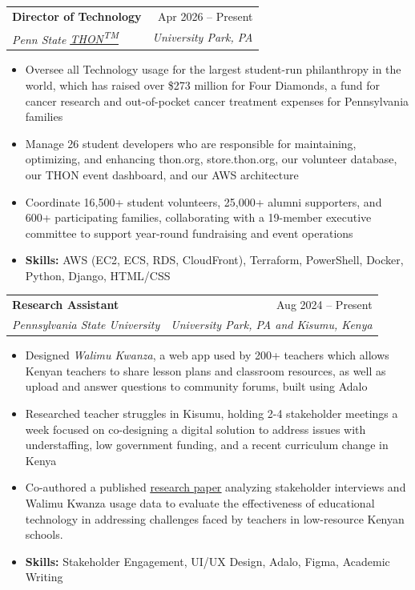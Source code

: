 \documentclass[letterpaper,11pt]{article}
\makeatletter
\newcommand{\resumeItem}[1]{
  \item\small{
    {#1\par\vspace{-2pt}}
  }
}
\newcommand{\resumeSubheading}[4]{
  \vspace{-2pt}\item
    \begin{tabular*}{0.97\textwidth}[t]{l@{\extracolsep{\fill}}r}
      \textbf{#1} & {#2} \\
      \textit{\small#3} & \textit{\small #4} \\
    \end{tabular*}\vspace{-7pt}
}
\newcommand{\resumeSubSubheading}[2]{
    \item
    \begin{tabular*}{0.97\textwidth}{l@{\extracolsep{\fill}}r}
      \textit{\small#1} & \textit{\small #2} \\
    \end{tabular*}\vspace{-7pt}
}
\newcommand{\resumeSubHeadingListEnd}{\end{itemize}}
\newcommand{\resumeItemListStart}{\begin{itemize}}
\newcommand{\resumeItemListEnd}{\end{itemize}\vspace{-5pt}}
\makeatother
\begin{document}
    \resumeSubheading
      {Director of Technology}{Apr 2026 -- Present}
      {Penn State \href{https://www.thon.org}{\underline{THON\textsuperscript{TM}}}}{University Park, PA}
      \resumeItemListStart
        \resumeItem{Oversee all Technology usage for the largest student-run philanthropy in the world, which has raised over \$273 
        million for Four Diamonds, a fund for cancer research and out-of-pocket cancer treatment expenses for Pennsylvania families}
        \resumeItem{Manage 26 student developers who are responsible for maintaining, optimizing, and enhancing thon.org, store.thon.org, our 
        volunteer database, our THON event dashboard, and our AWS architecture}
        \resumeItem{Coordinate 16,500+ student volunteers, 25,000+ alumni supporters, and 600+ participating families, collaborating with a
         19-member executive committee to support year-round fundraising and event operations}
        \resumeItem{\textbf{Skills:} AWS (EC2, ECS, RDS, CloudFront), Terraform, PowerShell, Docker, Python, Django, HTML/CSS}
      \resumeItemListEnd


    \resumeSubheading
      {Research Assistant}{Aug 2024  -- Present}
      {Pennsylvania State University}{University Park, PA and Kisumu, Kenya}
      \resumeItemListStart
        \resumeItem{Designed \textit{Walimu Kwanza}, a web app used by 200+ teachers
         which allows Kenyan teachers to share lesson plans and classroom resources, as well as upload and answer questions to community forums, built using Adalo}
        \resumeItem{Researched teacher struggles in Kisumu, holding 2-4 stakeholder meetings a week focused on
        co-designing a digital solution to address issues with understaffing, low government funding, and a recent curriculum change in Kenya}
        \resumeItem{Co-authored a published \href{https://drive.google.com/file/d/1CU3l_hCSALaeqdU16yC3cD25_rtbwR_I/view?usp=sharing}{\underline{research paper}} analyzing stakeholder interviews and Walimu Kwanza usage data to
         evaluate the effectiveness of educational technology in addressing challenges faced by teachers in low-resource Kenyan schools.}
        \resumeItem{\textbf{Skills:} Stakeholder Engagement, UI/UX Design, Adalo, Figma, Academic Writing}
    \resumeItemListEnd
\end{document}
